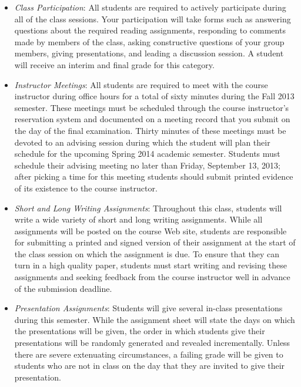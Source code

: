 \vspace*{-.05in}
\begin{itemize}

    \itemsep0em
    \item {\em Class Participation}: All students are required to actively participate during
        all of the class sessions. Your participation will take forms such as answering questions about the required
        reading assignments, responding to comments made by members of the class, asking constructive questions of your
        group members, giving presentations, and leading a discussion session. A student will receive an interim and
        final grade for this category.

    \item {\em Instructor Meetings}: All students are required to meet with the course instructor during office
        hours for a total of sixty minutes during the Fall 2013 semester.  These meetings must be scheduled through the
        course instructor's reservation system and documented on a meeting record that you submit on the day of the final
        examination.  Thirty minutes of these meetings must be devoted to an advising session during which the student
        will plan their schedule for the upcoming Spring 2014 academic semester.  Students must schedule their advising
        meeting no later than Friday, September 13, 2013; after picking a time for this meeting students should submit
        printed evidence of its existence to the course instructor.

    \item {\em Short and Long Writing Assignments}: Throughout this class, students will write a wide variety of short
        and long writing assignments.  While all assignments will be posted on the course Web site, students are
        responsible for submitting a printed and signed version of their assignment at the start of the class session on
        which the assignment is due.  To ensure that they can turn in a high quality paper, students must start writing
        and revising these assignments and seeking feedback from the course instructor well in advance of the submission
        deadline.

    \item {\em Presentation Assignments}: Students will give several in-class presentations during this semester. While
        the assignment sheet will state the days on which the presentations will be given, the order in which students
        give their presentations will be randomly generated and revealed incrementally.  Unless there are severe
        extenuating circumstances, a failing grade will be given to students who are not in class on the day that they
        are invited to give their presentation.


\end{itemize}

